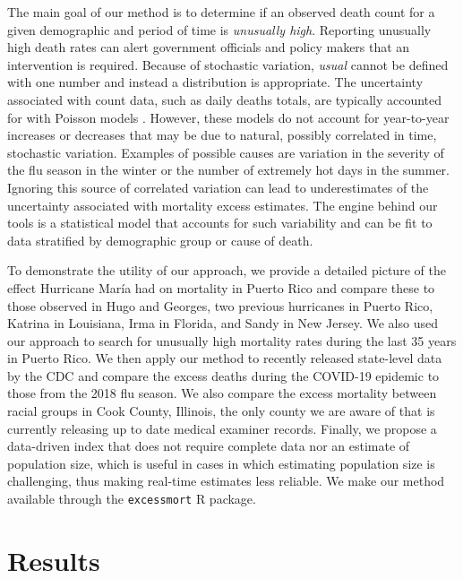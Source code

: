 \documentclass[11pt]{article}
\begin{document}
The main goal of our method is to determine if an observed death count for a given demographic and period of time is \textit{unusually high}. Reporting unusually high death rates can alert government officials and policy makers that an intervention is required. Because of stochastic variation, \textit{usual} cannot be defined with one number and instead a distribution is appropriate. The uncertainty associated with count data, such as daily deaths totals, are typically accounted for with Poisson models \cite{mccullagh19831989, agresti2015foundations}. However, these models do not account for year-to-year increases or decreases that may be due to natural, possibly correlated in time, stochastic variation. Examples of possible causes are variation in the severity of the flu season in the winter or the number of extremely hot days in the summer. Ignoring this source of correlated variation can lead to underestimates of the uncertainty associated with mortality excess estimates. The engine behind our tools is a statistical model that accounts for such variability and can be fit to data stratified by demographic group or cause of death. 

To demonstrate the utility of our approach, we provide a detailed picture of the effect Hurricane Mar\'ia had on mortality in Puerto Rico and compare these to those observed in Hugo and Georges, two previous hurricanes in Puerto Rico, Katrina in Louisiana, Irma in Florida, and Sandy in New Jersey. We also used our approach to search for unusually high mortality rates during the last 35 years in Puerto Rico. We then apply our method to recently released state-level data by the CDC and compare the excess deaths during the COVID-19 epidemic to those from the 2018 flu season. We also compare the excess mortality between racial groups in Cook County, Illinois, the only county we are aware of that is currently releasing up to date medical examiner records. Finally, we propose a data-driven index that does not require complete data nor an estimate of population size, which is useful in cases in which estimating population size is challenging, thus making real-time estimates less reliable. We make our method available through the \verb+excessmort+ R package.

\section{Results}
\label{sec:results}
\end{document}
